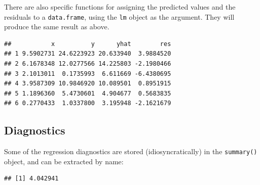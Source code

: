\documentclass[]{book}
\newenvironment{Shaded}{\begin{snugshade}}{\end{snugshade}}
\newcommand{\KeywordTok}[1]{\textcolor[rgb]{0.13,0.29,0.53}{\textbf{#1}}}
\newcommand{\CommentTok}[1]{\textcolor[rgb]{0.56,0.35,0.01}{\textit{#1}}}
\newcommand{\OperatorTok}[1]{\textcolor[rgb]{0.81,0.36,0.00}{\textbf{#1}}}
\newcommand{\NormalTok}[1]{#1}
\theoremstyle{definition}
\theoremstyle{definition}
\theoremstyle{definition}
\theoremstyle{remark}
\begin{document}
There are also specific functions for assigning the predicted values and
the residuals to a \texttt{data.frame}, using the \texttt{lm} object as
the argument. They will produce the same result as above.

\begin{Shaded}
\end{Shaded}

\begin{verbatim}
##           x          y      yhat        res
## 1 9.5902731 24.6223923 20.633940  3.9884520
## 2 6.1678348 12.0277566 14.225803 -2.1980466
## 3 2.1013011  0.1735993  6.611669 -6.4380695
## 4 3.9587309 10.9846920 10.089501  0.8951915
## 5 1.1896360  5.4730601  4.904677  0.5683835
## 6 0.2770433  1.0337800  3.195948 -2.1621679
\end{verbatim}

\subsection{Diagnostics}\label{diagnostics}

Some of the regression diagnostics are stored (idiosyncratically) in the
\texttt{summary()} object, and can be extracted by name:

\begin{Shaded}
\end{Shaded}

\begin{verbatim}
## [1] 4.042941
\end{verbatim}

\begin{Shaded}
\end{Shaded}
\end{document}
